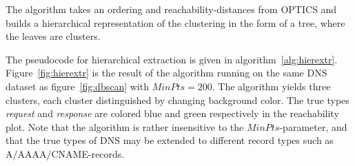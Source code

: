 \documentclass[a4paper]{report}
\begin{document}
The algorithm takes an ordering and reachability-distances from OPTICS and
builds a hierarchical representation of the clustering in the form of a tree,
where the leaves are clusters.

The pseudocode for hierarchical extraction is given in 
algorithm~\ref{alg:hierextr}. Figure~\ref{fig:hierextr} is the result of
the algorithm running on the same DNS dataset as figure~\ref{fig:dbscan}
with $MinPts = 200$. The algorithm yields three clusters, each cluster
distinguished by changing background color. The true types \emph{request} and
\emph{response} are colored blue and green respectively in the reachability
plot. Note that the algorithm is rather insensitive to the $MinPts$-parameter,
and that the true types of DNS may be extended to different record types such
as A/AAAA/CNAME-records.
\end{document}
